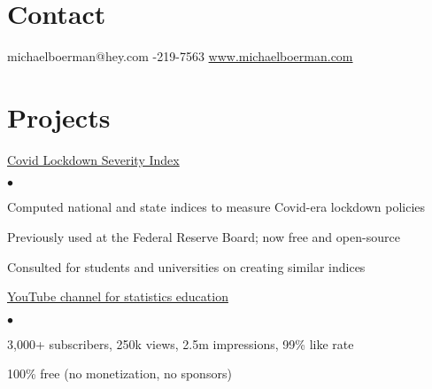 \documentclass[margin, line]{res}
\newenvironment{list2}{
  \begin{list}{$\bullet$}{%
      \setlength{\itemsep}{0.04in}
      \setlength{\parsep}{0in} \setlength{\parskip}{0in}
      \setlength{\topsep}{0.05in} \setlength{\partopsep}{0in} 
      \setlength{\leftmargin}{\dimexpr 26pt-0.05in}}}
    {\end{list}}
\begin{document}
\address{Data scientist with M.S. and 3 years experience driving decisions by modeling financial and economic data.}
\begin{resume}

\vspace{-1mm}
\section{\sc Contact}

\faEnvelope  \hspace{1mm} {\ttfamily michaelboerman@hey.com} \hspace{7mm}
\faPhone  \hspace{1mm} {-219-7563} \hspace{10mm}
\faBriefcase \hspace{1mm} \href{https://www.michaelboerman.com/}{\ttfamily www.michaelboerman.com} \hspace{3.5mm}

\vspace{0mm}


\section{\sc Projects}

\faChartLine \hspace{0.5mm} \href{https://michaelboerman.github.io/lockdown_severity_index/}{Covid Lockdown Severity Index}
    \begin{list2}
        \item Computed national and state indices to measure Covid-era lockdown policies
        \item Previously used at the Federal Reserve Board; now free and open-source
        \item Consulted for students and universities on creating similar indices
    \end{list2}

 \hspace{0.5mm} \href{https://www.youtube.com/@explainedbymichael/videos}{YouTube channel for statistics education}
    \begin{list2}
        \item 3,000+ subscribers, 250k views, 2.5m impressions, 99\% like rate
        \item 100\% free (no monetization, no sponsors)
    \end{list2}


\end{resume}
\end{document}
